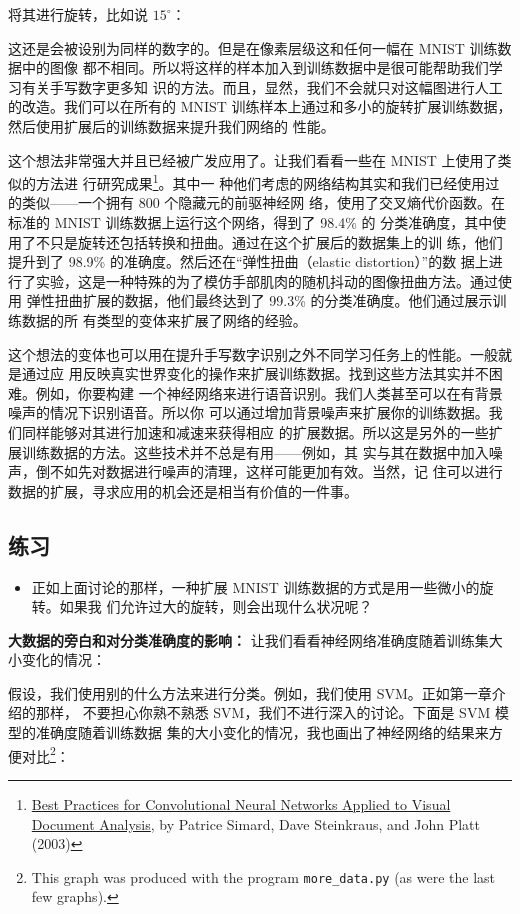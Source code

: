 将其进行旋转，比如说 $15^{\circ}$：

这还是会被设别为同样的数字的。但是在像素层级这和任何一幅在 MNIST 训练数据中的图像
都不相同。所以将这样的样本加入到训练数据中是很可能帮助我们学习有关手写数字更多知
识的方法。而且，显然，我们不会就只对这幅图进行人工的改造。我们可以在所有的 MNIST
训练样本上通过和多小的旋转扩展训练数据，然后使用扩展后的训练数据来提升我们网络的
性能。

这个想法非常强大并且已经被广发应用了。让我们看看一些在 MNIST 上使用了类似的方法进
行研究成果\footnote{\href{http://dx.doi.org/10.1109/ICDAR.2003.1227801}{Best
    Practices for Convolutional Neural Networks Applied to Visual Document
    Analysis}, by Patrice Simard, Dave Steinkraus, and John Platt (2003)}。其中一
种他们考虑的网络结构其实和我们已经使用过的类似——一个拥有 800 个隐藏元的前驱神经网
络，使用了交叉熵代价函数。在标准的 MNIST 训练数据上运行这个网络，得到了 98.4\% 的
分类准确度，其中使用了不只是旋转还包括转换和扭曲。通过在这个扩展后的数据集上的训
练，他们提升到了 98.9\% 的准确度。然后还在“弹性扭曲（elastic distortion）”的数
据上进行了实验，这是一种特殊的为了模仿手部肌肉的随机抖动的图像扭曲方法。通过使用
弹性扭曲扩展的数据，他们最终达到了 99.3\% 的分类准确度。他们通过展示训练数据的所
有类型的变体来扩展了网络的经验。

这个想法的变体也可以用在提升手写数字识别之外不同学习任务上的性能。一般就是通过应
用反映真实世界变化的操作来扩展训练数据。找到这些方法其实并不困难。例如，你要构建
一个神经网络来进行语音识别。我们人类甚至可以在有背景噪声的情况下识别语音。所以你
可以通过增加背景噪声来扩展你的训练数据。我们同样能够对其进行加速和减速来获得相应
的扩展数据。所以这是另外的一些扩展训练数据的方法。这些技术并不总是有用——例如，其
实与其在数据中加入噪声，倒不如先对数据进行噪声的清理，这样可能更加有效。当然，记
住可以进行数据的扩展，寻求应用的机会还是相当有价值的一件事。

\subsection*{练习}

\begin{itemize}
\item 正如上面讨论的那样，一种扩展 MNIST 训练数据的方式是用一些微小的旋转。如果我
  们允许过大的旋转，则会出现什么状况呢？
\end{itemize}

\textbf{大数据的旁白和对分类准确度的影响：} 让我们看看神经网络准确度随着训练集大
小变化的情况：

假设，我们使用别的什么方法来进行分类。例如，我们使用 SVM。正如第一章介绍的那样，
不要担心你熟不熟悉 SVM，我们不进行深入的讨论。下面是 SVM 模型的准确度随着训练数据
集的大小变化的情况，我也画出了神经网络的结果来方便对比\footnote{This graph was
  produced with the program \lstinline!more_data.py! (as were the last few
  graphs).}：

